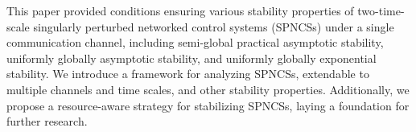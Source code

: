 This paper provided conditions ensuring various stability properties of two-time-scale singularly perturbed networked control systems (SPNCSs) under a single communication channel, including semi-global practical asymptotic stability, uniformly globally asymptotic stability, and uniformly globally exponential stability. 
%
We introduce a framework for analyzing SPNCSs, extendable to multiple channels and time scales, and other stability properties. Additionally, we propose a resource-aware strategy for stabilizing SPNCSs, laying a foundation for further research.



